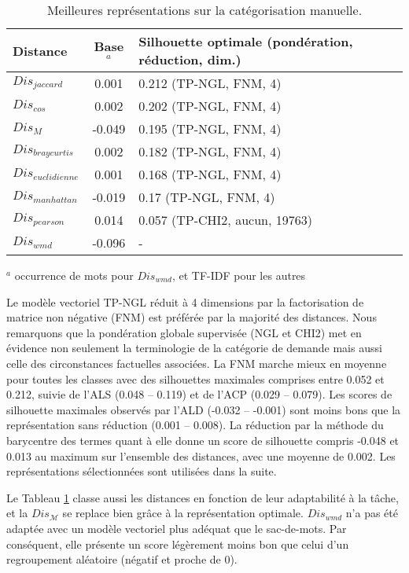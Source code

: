 \begin{table}[!htb]
	\scriptsize \centering
	\begin{tabular}[pos]{|l|c|l|}
		\hline
		\textbf{Distance}&\textbf{Base$^a$}&\textbf{Silhouette optimale   (pondération, réduction, dim.)} \\ \hline
		$Dis_{jaccard}$ & 0.001 & 0.212 (TP-NGL, FNM, 4) \\ \hline
		$Dis_{cos}$ & 0.002 & 0.202 (TP-NGL, FNM, 4) \\ \hline
		$Dis_{M}$ & -0.049 & 0.195 (TP-NGL, FNM, 4) \\ \hline
		$Dis_{braycurtis}$ & 0.002& 0.182 (TP-NGL, FNM, 4) \\ \hline
		$Dis_{euclidienne}$ & 0.001& 0.168  (TP-NGL, FNM, 4) \\ \hline
		$Dis_{manhattan}$ & -0.019& 0.17   (TP-NGL, FNM, 4) \\ \hline
		$Dis_{pearson}$ & 0.014 & 0.057 (TP-CHI2, aucun, 19763) \\ \hline
		$Dis_{wmd}$ & -0.096 &  - \\ \hline
	\end{tabular}

	$^a$ occurrence de mots pour $Dis_{wmd}$, et TF-IDF pour les autres
    \caption{Meilleures représentations sur la catégorisation manuelle.} \label{tab:similarite:silhouette-vecteur-manuel}
\end{table}

 
Le modèle vectoriel TP-NGL réduit à 4 dimensions par la factorisation de matrice non négative (FNM) est préférée par la majorité des distances. Nous remarquons que la pondération globale supervisée (NGL et CHI2) met en évidence non seulement la terminologie de la catégorie de demande mais aussi celle des circonstances factuelles associées. La FNM marche mieux en moyenne pour toutes les classes avec des silhouettes maximales comprises entre 0.052 et 0.212, suivie de l'ALS (0.048 -- 0.119) et de l'ACP (0.029 -- 0.079). Les scores de silhouette maximales observés par l'ALD (-0.032 -- -0.001) sont moins bons que la représentation sans réduction (0.001 -- 0.008). La réduction par la méthode du barycentre des termes quant à elle donne un score de silhouette compris -0.048 et 0.013 au maximum sur l'ensemble des distances, avec une moyenne de 0.002.
Les représentations sélectionnées sont utilisées dans la suite. 

Le Tableau \ref{tab:similarite:silhouette-vecteur-manuel} classe aussi les distances en fonction de leur adaptabilité à la tâche, et la $Dis_\mathcal{M}$ se replace bien grâce à la représentation optimale. $Dis_{wmd}$ n'a pas été adaptée avec un modèle vectoriel plus adéquat que le sac-de-mots. Par conséquent, elle présente un score légèrement moins bon que celui d'un regroupement aléatoire (négatif et proche de 0).


